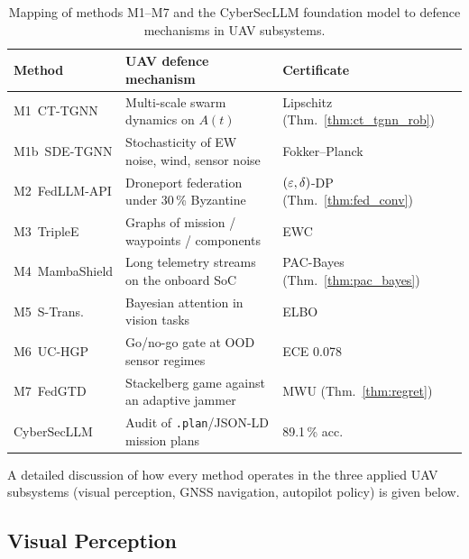 \begin{table}[H]
\centering
\caption{Mapping of methods \textsf{M1}--\textsf{M7} and the
\textsf{CyberSecLLM} foundation model to defence mechanisms in UAV
subsystems.}
\label{tab:uav_mapping}
\small
\setlength{\tabcolsep}{4pt}
\renewcommand{\arraystretch}{1.2}
\begin{tabularx}{\linewidth}{@{}lXl@{}}
\toprule
\textbf{Method} & \textbf{UAV defence mechanism} & \textbf{Certificate}\\
\midrule
\textsf{M1~CT-TGNN}    & Multi-scale swarm dynamics on $A(t)$                 & Lipschitz (Thm.~\ref{thm:ct_tgnn_rob})\\
\textsf{M1b~SDE-TGNN}  & Stochasticity of EW noise, wind, sensor noise        & Fokker--Planck\\
\textsf{M2~FedLLM-API} & Droneport federation under 30\,\% Byzantine          & $(\varepsilon,\delta)$-DP (Thm.~\ref{thm:fed_conv})\\
\textsf{M3~TripleE}    & Graphs of mission / waypoints / components           & EWC\\
\textsf{M4~MambaShield}& Long telemetry streams on the onboard SoC            & PAC-Bayes (Thm.~\ref{thm:pac_bayes})\\
\textsf{M5~S-Trans.}   & Bayesian attention in vision tasks                   & ELBO\\
\textsf{M6~UC-HGP}     & Go/no-go gate at OOD sensor regimes                  & ECE 0.078\\
\textsf{M7~FedGTD}     & Stackelberg game against an adaptive jammer          & MWU (Thm.~\ref{thm:regret})\\
\textsf{CyberSecLLM}   & Audit of \texttt{.plan}/JSON-LD mission plans         & 89.1\,\% acc.\\
\bottomrule
\end{tabularx}
\end{table}

A detailed discussion of how every method operates in the three
applied UAV subsystems (visual perception, GNSS navigation, autopilot
policy) is given below.

\subsection{Visual Perception}
\label{sec:uav_vision}

